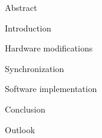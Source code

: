 




\usepackage{antropy_en}


  

  \begin{topchapter}{Abstract}
    
  \end{topchapter}

  \begin{topchapter}{Introduction}
    
  \end{topchapter}

  \begin{topchapter}{Hardware modifications}
    
  \end{topchapter}

  \begin{topchapter}{Synchronization}
    
  \end{topchapter}

  \begin{topchapter}{Software implementation}
    
  \end{topchapter}

  \begin{topchapter}{Conclusion}
    
  \end{topchapter}

  \begin{topchapter}{Outlook}
    
  \end{topchapter}

  \newpage
  \printglossaries
  \printbibliography

